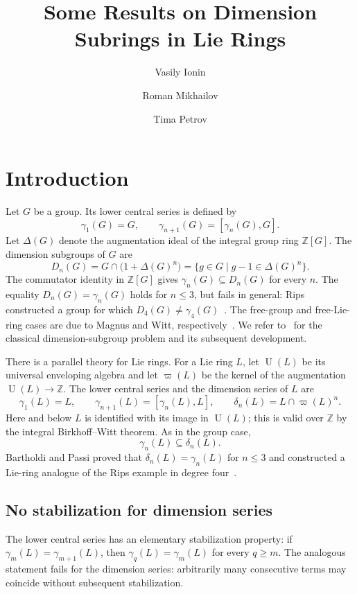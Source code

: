 \documentclass[a4paper,11pt,reqno]{amsart}
\title{Some Results on Dimension Subrings in Lie Rings}
\author{Vasily Ionin}
\author{Roman Mikhailov}
\author{Tima Petrov}
\date{}
\theoremstyle{definition}
\newcommand{\Z}{\mathbb Z}
\newcommand{\U}{\operatorname U}
\begin{document}
\maketitle

\section{Introduction}

Let $G$ be a group.  Its lower central series is defined by
\[
 \gamma _1(G)=G,
 \qquad
 \gamma _{n+1}(G)=[\gamma _n(G),G].
\]
Let $\Delta(G)$ denote the augmentation ideal of the integral group ring
$\Z[G]$.  The dimension subgroups of $G$ are
\[
 D_n(G)=G\cap\bigl(1+\Delta(G)^n\bigr)
       =\{g\in G\mid g-1\in\Delta(G)^n\}.
\]
The commutator identity in $\Z[G]$ gives
$\gamma_n(G)\subseteq D_n(G)$ for every $n$.  The equality
$D_n(G)=\gamma_n(G)$ holds for $n\leq 3$, but fails in general: Rips
constructed a group for which $D_4(G)\neq\gamma_4(G)$~\cite{Rips1972}.
The free-group and free-Lie-ring cases are due to Magnus
and Witt, respectively~\cite{Magnus1937,Witt1937}.  We refer
to~\cite{Passi1979,MikhailovPassi2009} for the classical dimension-subgroup
problem and its subsequent development.

There is a parallel theory for Lie rings.  For a Lie ring $L$, let $\U(L)$
be its universal enveloping algebra and let $\varpi(L)$ be the kernel of the
augmentation $\U(L)\to\Z$.  The lower central series and the dimension
series of $L$ are
\[
 \gamma_1(L)=L,
 \qquad
 \gamma_{n+1}(L)=[\gamma_n(L),L],
 \qquad
 \delta_n(L)=L\cap\varpi(L)^n.
\]
Here and below $L$ is identified with its image in $\U(L)$; this is valid
over $\Z$ by the integral Birkhoff--Witt theorem.  As in the group case,
\[
                     \gamma_n(L)\subseteq\delta_n(L).
\]
Bartholdi and Passi proved that
$\delta_n(L)=\gamma_n(L)$ for $n\leq3$ and constructed a Lie-ring analogue
of the Rips example in degree four~\cite{BartholdiPassi2015}.

\subsection{No stabilization for dimension series}

The lower central series has an elementary stabilization property: if
$\gamma_m(L)=\gamma_{m+1}(L)$, then $\gamma_q(L)=\gamma_m(L)$ for every
$q\geq m$.  The analogous statement fails for the dimension series:
arbitrarily many consecutive terms may coincide without subsequent
stabilization.
\end{document}
